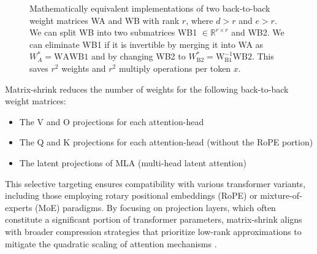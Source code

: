 \documentclass{article}
\begin{document}
\begin{figure}[h]
\centering
\caption{Mathematically equivalent implementations of two back-to-back weight matrices WA and WB with rank $r$, where $d > r$ and $e > r$. We can split WB into two submatrices WB1 $\in \mathbb{R}^{r \times r}$ and WB2. We can eliminate WB1 if it is invertible by merging it into WA as $W^{*}_{A} = \text{WAWB1}$ and by changing WB2 to $W^{*}_{\text{B2}} = \text{W}^{-1}_{\text{B1}}\text{WB2}$. This saves $r^{2}$ weights and $r^{2}$ multiply operations per token $x$.}
\label{fig:fig1}
\end{figure}

Matrix-shrink reduces the number of weights for the following back-to-back weight matrices:

\begin{itemize}
\item The V and O projections for each attention-head
\item The Q and K projections for each attention-head (without the RoPE portion)
\item The latent projections of MLA (multi-head latent attention)
\end{itemize}

This selective targeting ensures compatibility with various transformer variants, including those employing rotary positional embeddings (RoPE) or mixture-of-experts (MoE) paradigms. By focusing on projection layers, which often constitute a significant portion of transformer parameters, matrix-shrink aligns with broader compression strategies that prioritize low-rank approximations to mitigate the quadratic scaling of attention mechanisms \cite{arxiv2024lowrank}.
\end{document}
